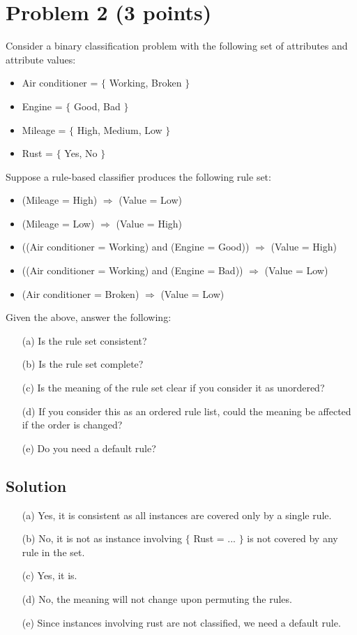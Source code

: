 \documentclass[10pt]{article}
\begin{document}
\section*{Problem 2 (3 points)}
\color{blue}
Consider a binary classification problem with the following set of attributes and attribute values:
\begin{itemize}
\item Air conditioner = $\{$ Working, Broken $\}$
\item Engine = $\{$ Good, Bad $\}$
\item Mileage = $\{$ High, Medium, Low $\}$
\item Rust = $\{$ Yes, No $\}$
\end{itemize}
Suppose a rule-based classifier produces the following rule set:
\begin{itemize}
\item (Mileage = High) $\Rightarrow$ (Value = Low)
\item (Mileage = Low) $\Rightarrow$ (Value = High)
\item ((Air conditioner = Working) and (Engine = Good)) $\Rightarrow$ (Value = High)
\item ((Air conditioner = Working) and (Engine = Bad)) $\Rightarrow$ (Value = Low)
\item (Air conditioner = Broken) $\Rightarrow$ (Value = Low)
\end{itemize}
Given the above, answer the following:
\begin{itemize}
\item[(a)] Is the rule set consistent?
\item[(b)] Is the rule set complete?
\item[(c)] Is the meaning of the rule set clear if you consider it as unordered?
\item[(d)] If you consider this as an ordered rule list, could the meaning be affected if the order is changed?
\item[(e)] Do you need a default rule?
\end{itemize}
\color{black}

\subsection*{Solution}
\begin{itemize}
\item[(a)] Yes, it is consistent as all instances are covered only by a single rule.
\item[(b)] No, it is not as instance involving $\{$ Rust = ... $\}$ is not covered by any rule in the set.
\item[(c)] Yes, it is.
\item[(d)] No, the meaning will not change upon permuting the rules.
\item[(e)] Since instances involving rust are not classified, we need a default rule.
\end{itemize}
\end{document}
